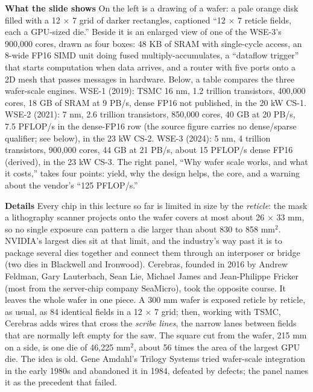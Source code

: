 \documentclass[11pt,letterpaper]{article}
\newcommand{\para}[1]{\medskip\noindent\textbf{#1}\quad}
\begin{document}
\para{What the slide shows} On the left is a drawing of a wafer: a pale orange disk filled with a 12 $\times$ 7 grid of darker rectangles, captioned ``12 $\times$ 7 reticle fields, each a GPU-sized die.'' Beside it is an enlarged view of one of the WSE-3's 900{,}000 cores, drawn as four boxes: 48 KB of SRAM with single-cycle access, an 8-wide FP16 SIMD unit doing fused multiply-accumulates, a ``dataflow trigger'' that starts computation when data arrives, and a router with five ports onto a 2D mesh that passes messages in hardware. Below, a table compares the three wafer-scale engines. WSE-1 (2019): TSMC 16 nm, 1.2 trillion transistors, 400{,}000 cores, 18 GB of SRAM at 9 PB/s, dense FP16 not published, in the 20 kW CS-1. WSE-2 (2021): 7 nm, 2.6 trillion transistors, 850{,}000 cores, 40 GB at 20 PB/s, 7.5 PFLOP/s in the dense-FP16 row (the source figure carries no dense/sparse qualifier; see below), in the 23 kW CS-2. WSE-3 (2024): 5 nm, 4 trillion transistors, 900{,}000 cores, 44 GB at 21 PB/s, about 15 PFLOP/s dense FP16 (derived), in the 23 kW CS-3. The right panel, ``Why wafer scale works, and what it costs,'' takes four points: yield, why the design helps, the core, and a warning about the vendor's ``125 PFLOP/s.''

\para{Details} Every chip in this lecture so far is limited in size by the \emph{reticle}: the mask a lithography scanner projects onto the wafer covers at most about 26 $\times$ 33 mm, so no single exposure can pattern a die larger than about 830 to 858 mm$^2$. NVIDIA's largest dies sit at that limit, and the industry's way past it is to package several dies together and connect them through an interposer or bridge (two dies in Blackwell and Ironwood). Cerebras, founded in 2016 by Andrew Feldman, Gary Lauterbach, Sean Lie, Michael James and Jean-Philippe Fricker (most from the server-chip company SeaMicro), took the opposite course. It leaves the whole wafer in one piece. A 300 mm wafer is exposed reticle by reticle, as usual, as 84 identical fields in a 12 $\times$ 7 grid; then, working with TSMC, Cerebras adds wires that cross the \emph{scribe lines}, the narrow lanes between fields that are normally left empty for the saw. The square cut from the wafer, 215 mm on a side, is one die of 46{,}225 mm$^2$, about 56 times the area of the largest GPU die. The idea is old. Gene Amdahl's Trilogy Systems tried wafer-scale integration in the early 1980s and abandoned it in 1984, defeated by defects; the panel names it as the precedent that failed.
\end{document}

